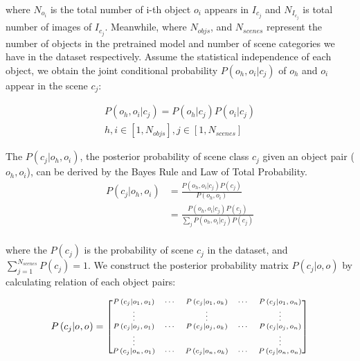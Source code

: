 \documentclass[letterpaper, 10 pt, conference]{ieeeconf}  %
\begin{document}
where $N_{o_i}$ is the total number of i-th object $o_i$ appears in $I_{c_j}$ and $N_{I_{c_j}}$ is total number of images of $I_{c_j}$. Meanwhile, where $N_{objs}$, and $N_{scenes}$ represent the number of objects in the pretrained model and number of scene categories we have in the dataset respectively.
Assume the statistical independence of each object, we obtain the joint conditional probability $P\left(o_{h}, o_{i} | c_{j}\right)$ of $o_h$ and $o_i$ appear in the scene $c_j$:

\begin{equation}
\begin{split}
P\left(o_{h}, o_{i} | c_{j}\right) = P\left(o_{h} | c_{j}\right) P\left(o_{i} | c_{j}\right)\label{joint probability} \\
h, i \in [1,N_{objs}], j \in [1,N_{scenes}]
\end{split}
\end{equation}

The $P(c_{j}|o_{h},o_{i})$, the posterior probability of scene class $c_{j}$ given an object pair ($o_{h},o_{i}$), can be derived by the Bayes Rule and Law of Total Probability. 
\begin{equation}
\begin{split}
P\left(c_{j} | o_{h},o_{i}\right)& =\frac{P\left(o_{h},o_{i} | c_{j}\right) P\left(c_{j}\right)}{P(o_{h},o_{i})} \\
&=\frac{P\left(o_{h},o_{i} | c_{j}\right) P\left(c_{j}\right)}{\sum_{j} P\left(o_{h},o_{i} | c_{j}\right) P\left(c_{j}\right)} \\
\end{split}
\end{equation}

where the $P(c_j)$ is the probability of scene $c_j$ in the dataset, and $\sum_{j=1}^{N_{scenes}}P(c_j)=1$. We construct the posterior probability matrix $P(c_j|o,o)$ by calculating relation of each object pairs:

\begin{equation}
\scriptsize
P\left(c_{j} | o_{}, o_{}\right) =
\begin{bmatrix}
P\left( c_{j} | o_{1}, o_{1}\right) & \cdots & P\left( c_{j} | o_{1},o_{k}\right) & \cdots & P\left(c_{j} | o_{1}, o_{n}\right) \\
\vdots &  & \vdots &  & \vdots \\
P\left(c_{j}|o_{j}, o_{1}\right) & \cdots & P\left(c_{j} | o_{j},o_{k}\right) & \cdots & P\left(c_{j} | o_{j},o_{n}\right) \\
\vdots &  &  &  & \vdots \\
P\left(c_{j} | o_{n}, o_{1}\right) & \cdots & P\left(c_{j} | o_{n},o_{k}\right) & \cdots  & P\left(c_{j} | o_{n}, o_{n}\right)
\end{bmatrix}
\end{equation}
\end{document}
